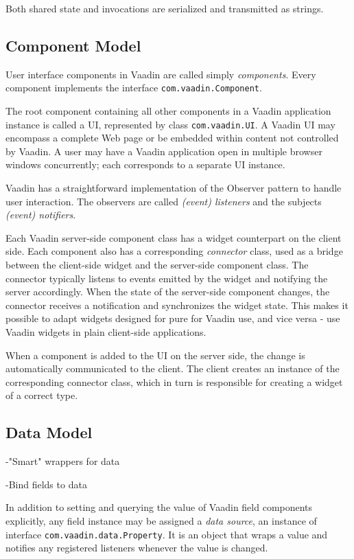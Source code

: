 Both shared state and  invocations are serialized and transmitted as  strings.

\subsection{Component Model}

User interface components in Vaadin are called simply \emph{components}. Every component implements the interface \texttt{com.vaadin.Component}.

The root component containing all other components in a Vaadin application instance is called a UI, represented by class \texttt{com.vaadin.UI}. A Vaadin UI may encompass a complete Web page or be embedded within content not controlled by Vaadin. A user may have a Vaadin application open in multiple browser windows concurrently; each corresponds to a separate UI instance.

Vaadin has a straightforward implementation of the Observer pattern to handle user interaction. The observers are called \emph{(event) listeners} and the subjects \emph{(event) notifiers}.

Each Vaadin server-side component class has a widget counterpart on the client side. Each component also has a corresponding \emph{connector} class, used as a bridge between the client-side widget and the server-side component class. The connector typically listens to events emitted by the widget and notifying the server accordingly. When the state of the server-side component changes, the connector receives a notification and synchronizes the widget state. This makes it possible to adapt widgets designed for pure  for Vaadin use, and vice versa - use Vaadin widgets in plain client-side  applications.

When a component is added to the UI on the server side, the change is automatically communicated to the client. The client creates an instance of the corresponding connector class, which in turn is responsible for creating a widget of a correct type. 

\subsection{Data Model}

-"Smart" wrappers for data

-Bind fields to data

In addition to setting and querying the value of Vaadin field components explicitly, any field instance may be assigned a \emph{data source}, an instance of interface \texttt{com.vaadin.data.Property}. It is an object that wraps a value and notifies any registered listeners whenever the value is changed.

